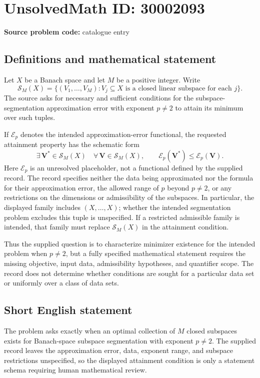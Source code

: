 \documentclass[11pt]{article}
\begin{document}
\section*{UnsolvedMath ID: 30002093}
\textbf{Source problem code:} catalogue entry
\subsection{Definitions and mathematical statement}
Let \(X\) be a Banach space and let \(M\) be a positive integer. Write
\[
\mathcal S_M(X)=\{(V_1,\ldots,V_M): V_j\subseteq X\text{ is a closed linear subspace for each }j\}.
\]
The source asks for necessary and sufficient conditions for the subspace-segmentation approximation error with exponent \(p\ne2\) to attain its minimum over such tuples.

If \(\mathcal E_p\) denotes the intended approximation-error functional, the requested attainment property has the schematic form
\[
\exists\,\mathbf V^*\in\mathcal S_M(X)\quad
\forall\,\mathbf V\in\mathcal S_M(X),\qquad
\mathcal E_p(\mathbf V^*)\leq\mathcal E_p(\mathbf V).
\]
Here \(\mathcal E_p\) is an unresolved placeholder, not a functional defined by the supplied record. The record specifies neither the data being approximated nor the formula for their approximation error, the allowed range of \(p\) beyond \(p\ne2\), or any restrictions on the dimensions or admissibility of the subspaces. In particular, the displayed family includes \((X,\ldots,X)\); whether the intended segmentation problem excludes this tuple is unspecified. If a restricted admissible family is intended, that family must replace \(\mathcal S_M(X)\) in the attainment condition.

Thus the supplied question is to characterize minimizer existence for the intended problem when \(p\ne2\), but a fully specified mathematical statement requires the missing objective, input data, admissibility hypotheses, and quantifier scope. The record does not determine whether conditions are sought for a particular data set or uniformly over a class of data sets.
\subsection{Short English statement}
The problem asks exactly when an optimal collection of \(M\) closed subspaces exists for Banach-space subspace segmentation with exponent \(p\ne2\). The supplied record leaves the approximation error, data, exponent range, and subspace restrictions unspecified, so the displayed attainment condition is only a statement schema requiring human mathematical review.
\end{document}
